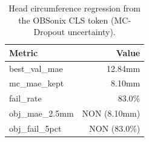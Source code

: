 \begin{table}[t]
\centering
\caption{Head circumference regression from the OBSonix CLS token (MC-Dropout uncertainty).}
\label{tab:hc}
\begin{tabular}{lr}
\toprule
Metric & Value \\
\midrule
best\_val\_mae & 12.84mm \\
mc\_mae\_kept & 8.10mm \\
fail\_rate & 83.0\% \\
obj\_mae\_2.5mm & NON (8.10mm) \\
obj\_fail\_5pct & NON (83.0\%) \\
\bottomrule
\end{tabular}
\end{table}